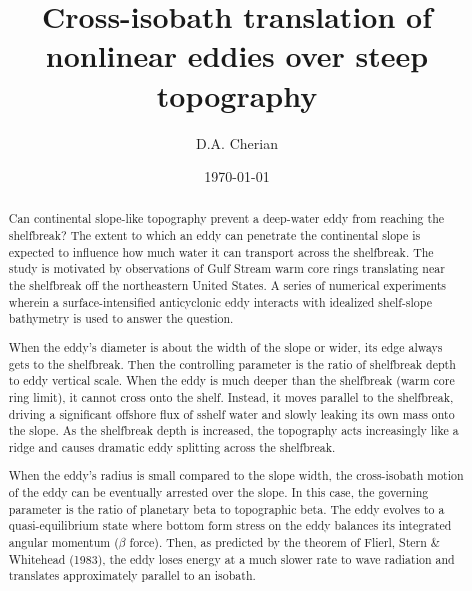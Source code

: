 

\usepackage{fontspec}
\usepackage{unicode-math}
\setmonofont{Inconsolata}
\newcommand\Hsb{H_\text{sb}}
\newcommand\tnd{t_\text{nd}}
\newcommand\bt{_\text{bot}}
\newcommand\ppx{\pp{}{x}}
\newcommand\ppy{\pp{}{y}}
\newcommand\ppt{\pp{}{t}}
\newcommand{\alert}[1]{\textbf{#1}}
\setcounter{secnumdepth}{2}
\author{D.A. Cherian}
\date{\today}
\title{Cross-isobath translation of nonlinear eddies over steep topography}


\maketitle
\begin{abstract}
Can continental slope-like topography prevent a deep-water eddy from reaching the shelfbreak? The extent to which an eddy can penetrate the continental slope is expected to influence how much water it can transport across the shelfbreak. The study is motivated by observations of Gulf Stream warm core rings translating near the shelfbreak off the northeastern United States. A series of numerical experiments wherein a surface-intensified anticyclonic eddy interacts with idealized shelf-slope bathymetry is used to answer the question.

When the eddy's diameter is about the width of the slope or wider, its edge always gets to the shelfbreak. Then the controlling parameter is the ratio of shelfbreak depth to eddy vertical scale. When the eddy is much deeper than the shelfbreak (warm core ring limit), it cannot cross onto the shelf. Instead, it moves parallel to the shelfbreak, driving a significant offshore flux of sshelf water and slowly leaking its own mass onto the slope. As the shelfbreak depth is increased, the topography acts increasingly like a ridge and causes dramatic eddy splitting across the shelfbreak.

When the eddy's radius is small compared to the slope width, the cross-isobath motion of the eddy can be eventually arrested over the slope. In this case, the governing parameter is the ratio of planetary beta to topographic beta. The eddy evolves to a quasi-equilibrium state where bottom form stress on the eddy balances its integrated angular momentum ($β$ force). Then, as predicted by the theorem of Flierl, Stern \& Whitehead (1983), the eddy loses energy at a much slower rate to wave radiation and translates approximately parallel to an isobath.
\end{abstract}

